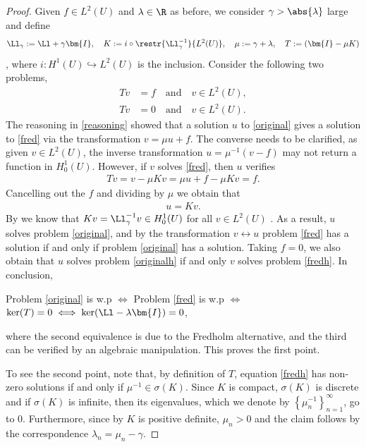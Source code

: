 \documentclass[
    a4paper,
    DIV=14,
    abstract=true,
    numbers=noenddot
]{scrartcl}
\begin{document}
\begin{proof}
    Given $f \in L^2(U)$ and $\lambda \in \R$ as before, we consider $\gamma > \abs{\lambda }$ large and define
    \begin{align*}
        \Ll _\gamma := \Ll + \gamma \bm{I}, \quad  K:= i \circ \restr{\Ll_\gamma ^{-1}}{L^2(U)}, \quad  \mu := \gamma + \lambda, \quad T := (\bm{I}- \mu K)
    \end{align*}
    , where $i : H^1(U) \hookrightarrow L^2(U)$ is the inclusion. Consider the following two problems,
    \begin{align}\label{fred}
        Tv & = f  \quad \text{and} \quad  v \in L^2(U),              \\
        Tv & = 0 \quad \text{and} \quad  v \in L^2(U). \label{fredh}
    \end{align}
    The reasoning in \eqref{reasoning} showed that a solution $u$ to \eqref{original} gives a solution to \eqref{fred} via the transformation $v=\mu u +f$. The converse needs to be clarified, as given $v \in L^2(U)$, the inverse transformation $u = \mu ^{-1}(v-f)$ may not return a function in $H_0^1(U)$. However, if $v$ solves \eqref{fred}, then $u$ verifies
    \begin{align*}
        Tv=v-\mu K v=\mu u +f - \mu K v=f.
    \end{align*}
    Cancelling out the $f$ and dividing by $\mu$ we obtain that
    \begin{align*}
        u =Kv.
    \end{align*}
    By  we know that $Kv = \Ll _\gamma ^{-1} v \in H_0^1(U)$ for all $v \in L^2(U)$ . As a result, $u$ solves problem \eqref{original}, and by the transformation $v \leftrightarrow u$ problem \eqref{fred} has a solution if and only if problem \eqref{original} has a solution. Taking $f=0$, we also obtain that $u$ solves problem \eqref{originalh} if and only $v$ solves problem \eqref{fredh}. In conclusion,
    \begin{center}
        Problem \eqref{original} is w.p $\iff$ Problem \eqref{fred} is w.p $\iff$ $\ker(T) =0 \iff \ker(\Ll -\lambda \bm{I} )=0$,
    \end{center}
    where the second equivalence is due to the Fredholm alternative, and the third can be verified by an algebraic manipulation. This proves the first point.

    To see the second point, note that, by definition of $T$, equation \eqref{fredh} has non-zero solutions if and only if $\mu ^{-1} \in \sigma (K)$. Since $K$ is compact, $\sigma(K)$ is discrete and if $\sigma (K)$ is infinite, then its eigenvalues, which we denote by $\left\{\mu _n^{-1}\right\}_{n=1}^\infty$, go to $0$. Furthermore, since by  $K$ is positive definite, $\mu_n >0$ and the claim follows by the correspondence $\lambda_n =\mu_n -\gamma$.


\end{proof}
\end{document}
